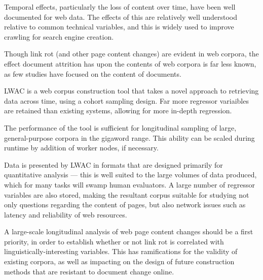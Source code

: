 

Temporal effects, particularly the loss of content over time, have been well documented for web data.  The effects of this are relatively well understood relative to common technical variables, and this is widely used to improve crawling for search engine creation.

Though link rot (and other page content changes) are evident in web corpora, the effect document attrition has upon the contents of web corpora is far less known, as few studies have focused on the content of documents.

LWAC is a web corpus construction tool that takes a novel approach to retrieving data across time, using a cohort sampling design.  Far more regressor variaibles are retained than existing systems, allowing for more in-depth regression.

The performance of the tool is sufficient for longitudinal sampling of large, general-purpose corpora in the gigaword range.  This ability can be scaled during runtime by addition of worker nodes, if necessary.

Data is presented by LWAC in formats that are designed primarily for quantitative analysis --- this is well suited to the large volumes of data produced, which for many tasks will swamp human evaluators.  A large number of regressor variables are also stored, making the resultant corpus suitable for studying not only questions regarding the content of pages, but also network issues such as latency and reliability of web resources.

A large-scale longitudinal analysis of web page content changes should be a first priority, in order to establish whether or not link rot is correlated with linguistically-interesting variables.  This has ramifications for the validity of existing corpora, as well as impacting on the design of future construction methods that are resistant to document change online.





